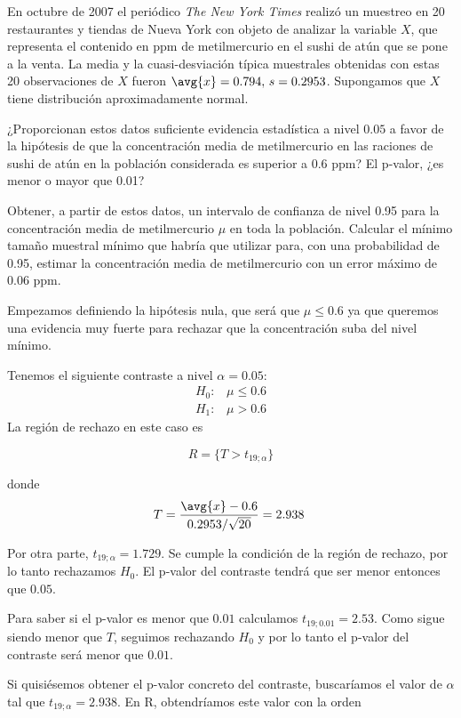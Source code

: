 \begin{problem}[1]
En octubre de 2007 el periódico \textit{The New York Times} realizó un muestreo en 20 restaurantes y tiendas de Nueva York con objeto de analizar la variable $X$, que representa el contenido en ppm de metilmercurio en el sushi de atún que se pone a la venta. La media y la cuasi-desviación típica muestrales obtenidas con estas 20 observaciones de $X$ fueron $\avg{x} = 0.794,\, s=0.2953$. Supongamos que $X$ tiene distribución aproximadamente normal.

\ppart ¿Proporcionan estos datos suficiente evidencia estadística a nivel $0.05$ a favor de la hipótesis de que la concentración media de metilmercurio en las raciones de sushi de atún en la población considerada es superior a 0.6 ppm? El p-valor, ¿es menor o mayor que 0.01?

\ppart Obtener, a partir de estos datos, un intervalo de confianza de nivel 0.95 para la concentración media de metilmercurio $\mu$ en toda la población. Calcular el mínimo tamaño muestral mínimo que habría que utilizar para, con una probabilidad de 0.95, estimar la concentración media de metilmercurio con un error máximo de 0.06 ppm.

\solution

\spart Empezamos definiendo la hipótesis nula, que será que $\mu \leq 0.6$ ya que queremos una evidencia muy fuerte para rechazar que la concentración suba del nivel mínimo.

Tenemos el siguiente contraste a nivel $\alpha = 0.05$:
\begin{gather*}
H_0 : \;\;\; \mu \leq 0.6\\
H_1 : \;\;\; \mu > 0.6
\end{gather*}
La región de rechazo en este caso es 

\[ R = \{ T > t_{19;\alpha} \}\]

donde \[ T = \frac{\avg{x} - 0.6}{0.2953/\sqrt{20}} = 2.938 \]

Por otra parte, $t_{19;\alpha} = 1.729$. Se cumple la condición de la región de rechazo, por lo tanto rechazamos $H_0$. El p-valor del contraste tendrá que ser menor entonces que $0.05$.

Para saber si el p-valor es menor que $0.01$ calculamos $t_{19;0.01}=2.53$. Como sigue siendo menor que $T$, seguimos rechazando $H_0$ y por lo tanto el p-valor del contraste será menor que $0.01$.

Si quisiésemos obtener el p-valor concreto del contraste, buscaríamos el valor de $\alpha$ tal que $ t_{19;\alpha} = 2.938$. En R, obtendríamos este valor con la orden


\end{problem}
